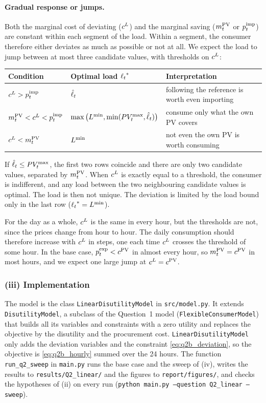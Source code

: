 \paragraph{Gradual response or jumps.}
Both the marginal cost of deviating ($c^{L}$) and the marginal saving ($m^{\mathrm{PV}}_{t}$ or $p^{\mathrm{imp}}_{t}$) are
constant within each segment of the load. Within a segment, the consumer therefore either
deviates as much as possible or not at all. We expect the load to jump between at most three
candidate values, with thresholds on $c^{L}$:
\begin{center}
\small
\begin{tabularx}{\textwidth}{llX}
    \toprule
    Condition & Optimal load ${\ell_{t}}^*$ & Interpretation \\
    \midrule
    $c^{L} > p^{\mathrm{imp}}_{t}$ & $\hat{\ell}_{t}$ & following the reference is worth even importing \\
    $m^{\mathrm{PV}}_{t} < c^{L} < p^{\mathrm{imp}}_{t}$ & $\max\big(L^{\min}, \min(PV_{t}^{\max}, \hat{\ell}_{t})\big)$ & consume only what the own PV covers \\
    $c^{L} < m^{\mathrm{PV}}_{t}$ & $L^{\min}$ & not even the own PV is worth consuming \\
    \bottomrule
\end{tabularx}
\end{center}
If $\hat{\ell}_{t} \leq PV_{t}^{\max}$, the first two rows coincide and there are only two candidate values,
separated by $m^{\mathrm{PV}}_{t}$. When $c^{L}$ is exactly equal to a threshold, the consumer is indifferent, and
any load between the two neighbouring candidate values is optimal. The load is then not
unique. The deviation is limited by the load bound only in the last row (${\ell_{t}}^* = L^{\min}$).

For the day as a whole, $c^{L}$ is the same in every hour, but the thresholds are not, since the
prices change from hour to hour. The daily consumption should therefore increase with $c^{L}$ in
steps, one each time $c^{L}$ crosses the threshold of some hour. In the base case,
$p^{\mathrm{exp}}_{t} < c^{\mathrm{PV}}$ in almost every hour, so $m^{\mathrm{PV}}_{t} = c^{\mathrm{PV}}$ in most hours, and we expect one large jump
at $c^{L} = c^{\mathrm{PV}}$.

\subsubsection{(iii) Implementation}
The model is the class \texttt{LinearDisutilityModel} in \texttt{src/model.py}. It extends \texttt{DisutilityModel}, a subclass of the Question~1 model (\texttt{FlexibleConsumerModel}) that builds all its variables and constraints with a zero utility and replaces the objective by the
disutility and the procurement cost. \texttt{LinearDisutilityModel} only adds the deviation variables and the constraint \eqref{eq:q2b_deviation}, so the objective is \eqref{eq:q2b_hourly} summed over the 24 hours. The function \texttt{run\_q2\_sweep} in \texttt{main.py} runs the base case
and the sweep of (iv), writes the results to \texttt{results/Q2\_linear/} and the figures to \texttt{report/figures/}, and checks the hypotheses of (ii) on every run (\texttt{python main.py --question Q2\_linear --sweep}).

